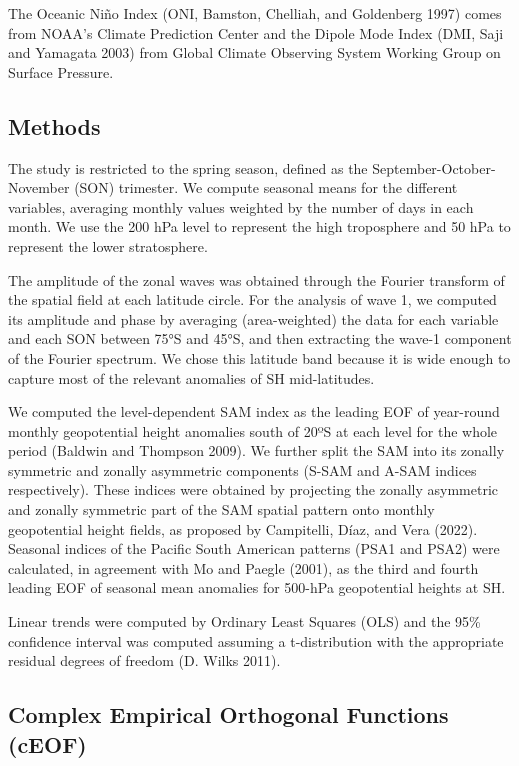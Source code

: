 \documentclass[smallextended]{svjour3}       %
\begin{document}
The Oceanic Niño Index (ONI, Bamston, Chelliah, and Goldenberg 1997) comes from NOAA's Climate Prediction Center and the Dipole Mode Index (DMI, Saji and Yamagata 2003) from Global Climate Observing System Working Group on Surface Pressure.

\hypertarget{methods-1}{%
\subsection{Methods}\label{methods-1}}

The study is restricted to the spring season, defined as the September-October-November (SON) trimester.
We compute seasonal means for the different variables, averaging monthly values weighted by the number of days in each month.
We use the 200 hPa level to represent the high troposphere and 50 hPa to represent the lower stratosphere.

The amplitude of the zonal waves was obtained through the Fourier transform of the spatial field at each latitude circle.
For the analysis of wave 1, we computed its amplitude and phase by averaging (area-weighted) the data for each variable and each SON between 75°S and 45°S, and then extracting the wave-1 component of the Fourier spectrum.
We chose this latitude band because it is wide enough to capture most of the relevant anomalies of SH mid-latitudes.

We computed the level-dependent SAM index as the leading EOF of year-round monthly geopotential height anomalies south of 20ºS at each level for the whole period (Baldwin and Thompson 2009).
We further split the SAM into its zonally symmetric and zonally asymmetric components (S-SAM and A-SAM indices respectively).
These indices were obtained by projecting the zonally asymmetric and zonally symmetric part of the SAM spatial pattern onto monthly geopotential height fields, as proposed by Campitelli, Díaz, and Vera (2022).
Seasonal indices of the Pacific South American patterns (PSA1 and PSA2) were calculated, in agreement with Mo and Paegle (2001), as the third and fourth leading EOF of seasonal mean anomalies for 500-hPa geopotential heights at SH.

Linear trends were computed by Ordinary Least Squares (OLS) and the 95\% confidence interval was computed assuming a t-distribution with the appropriate residual degrees of freedom (D. Wilks 2011).

\hypertarget{complex-empirical-orthogonal-functions-ceof}{%
\subsection{Complex Empirical Orthogonal Functions (cEOF)}\label{complex-empirical-orthogonal-functions-ceof}}
\end{document}
